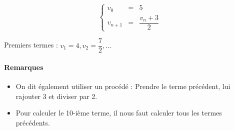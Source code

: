 \documentclass[11pt]{article}%
\begin{document}
\begin{multicols}{2}
\begin{equation*}
  \left\lbrace
  \begin{array}{ccc}
    v_0    &=& 5\\
    v_{n+1} &=& \dfrac{v_n + 3}{2}
  \end{array}\right.
\end{equation*}

Premiers termes : $v_1 = 4, v_2 = \dfrac{7}{2},...$

\paragraph{Remarques}

\begin{itemize}
\item On dit également utiliser un procédé : Prendre le terme précédent, lui rajouter 3 et diviser par 2.
\item Pour calculer le 10-ième terme, il nous faut calculer tous les termes précédents.
\end{itemize}

\end{multicols}

\hrulefill
\end{document}

